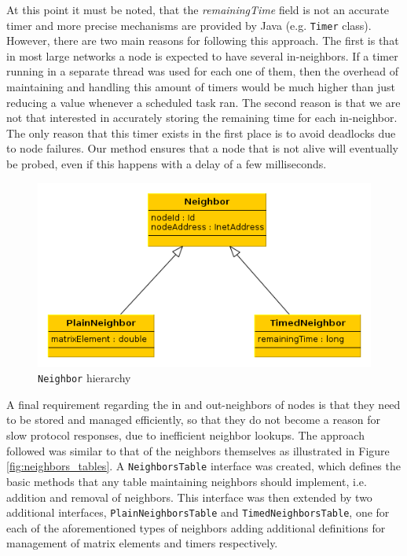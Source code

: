 \documentclass[a4paper,11pt,twoside]{report}
\newcommand{\classname}[1]{\texttt{#1}}
\begin{document}
At this point it must be noted, that the \textit{remainingTime} field is not an accurate timer and more precise mechanisms are provided by Java (e.g. \classname{Timer} class). However, there are two main reasons for following this approach. The first is that in most large networks a node is expected to have several in-neighbors. If a timer running in a separate thread was used for each one of them, then the overhead of maintaining and handling this amount of timers would be much higher than just reducing a value whenever a scheduled task ran. The second reason is that we are not that interested in accurately storing the remaining time for each in-neighbor. The only reason that this timer exists in the first place is to avoid deadlocks due to node failures. Our method ensures that a node that is not alive will eventually be probed, even if this happens with a delay of a few milliseconds.\\


\begin{figure} 
   \centering
     \includegraphics[scale=0.5]{../figures/neighbors.png}
	 \caption{\classname{Neighbor} hierarchy}
     \label{fig:neighbors_hier}
\end{figure}


A final requirement regarding the in and out-neighbors of nodes is that they need to be stored and managed efficiently, so that they do not become a reason for slow protocol responses, due to inefficient neighbor lookups. The approach followed was similar to that of the neighbors themselves as illustrated in Figure \ref{fig:neighbors_tables}. A \classname{NeighborsTable} interface was created, which defines the basic methods that any table maintaining neighbors should implement, i.e. addition and removal of neighbors. This interface was then extended by two additional interfaces, \classname{PlainNeighborsTable} and \classname{TimedNeighborsTable}, one for each of the aforementioned types of neighbors adding additional definitions for management of matrix elements and timers respectively. \\
\end{document}
